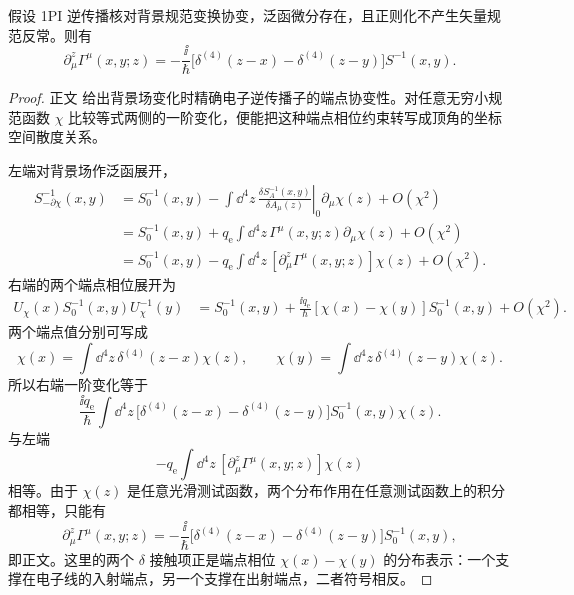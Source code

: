 \begin{proposition}
假设 1PI 逆传播核对背景规范变换协变，泛函微分存在，且正则化不产生矢量规范反常。则有
\begin{equation}
{
\partial_\mu^z\Gamma^\mu(x,y;z)
=-\frac{\ii}{\hbar}
\bigl[\delta^{(4)}(z-x)-\delta^{(4)}(z-y)\bigr]
S^{-1}(x,y).}
\label{eq:qed_ward_takahashi_coordinate}
\end{equation}
\end{proposition}
\begin{proof}
正文 给出背景场变化时精确电子逆传播子的端点协变性。对任意无穷小规范函数 $\chi$ 比较等式两侧的一阶变化，便能把这种端点相位约束转写成顶角的坐标空间散度关系。

左端对背景场作泛函展开，
\begin{align*}
 S_{-\partial\chi}^{-1}(x,y)
 &=S_0^{-1}(x,y)
 -\int\dd^4 z\,
 \left.\frac{\delta S_A^{-1}(x,y)}{\delta A_\mu(z)}\right|_0
 \partial_\mu\chi(z)+O(\chi^2)\\
 &=S_0^{-1}(x,y)
 +q_{\mathrm e}\int\dd^4 z\,\Gamma^\mu(x,y;z)\partial_\mu\chi(z)+O(\chi^2)\\
 &=S_0^{-1}(x,y)
 -q_{\mathrm e}\int\dd^4 z\,[\partial_\mu^z\Gamma^\mu(x,y;z)]\chi(z)+O(\chi^2).
\end{align*}
右端的两个端点相位展开为
\begin{align*}
 U_\chi(x)S_0^{-1}(x,y)U_\chi^{-1}(y)
 &=S_0^{-1}(x,y)
 +\frac{\ii q_{\mathrm e}}{\hbar}[\chi(x)-\chi(y)]S_0^{-1}(x,y)+O(\chi^2).
\end{align*}
两个端点值分别可写成
\begin{equation*}
 \chi(x)=\int\dd^4z\,\delta^{(4)}(z-x)\chi(z),
 \qquad
 \chi(y)=\int\dd^4z\,\delta^{(4)}(z-y)\chi(z).
\end{equation*}
所以右端一阶变化等于
\begin{equation*}
 \frac{\ii q_{\mathrm e}}{\hbar}\int\dd^4z\,
 \bigl[\delta^{(4)}(z-x)-\delta^{(4)}(z-y)\bigr]
 S_0^{-1}(x,y)\chi(z).
\end{equation*}
与左端
\begin{equation*}
 -q_{\mathrm e}\int\dd^4z\,
 [\partial_\mu^z\Gamma^\mu(x,y;z)]\chi(z)
\end{equation*}
相等。由于 $\chi(z)$ 是任意光滑测试函数，两个分布作用在任意测试函数上的积分都相等，只能有
\begin{equation*}
 \partial_\mu^z\Gamma^\mu(x,y;z)
 =-\frac{\ii}{\hbar}
 \bigl[\delta^{(4)}(z-x)-\delta^{(4)}(z-y)\bigr]
 S_0^{-1}(x,y),
\end{equation*}
即正文。这里的两个 $\delta$ 接触项正是端点相位 $\chi(x)-\chi(y)$ 的分布表示：一个支撑在电子线的入射端点，另一个支撑在出射端点，二者符号相反。
\end{proof}

